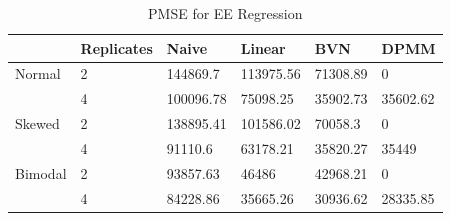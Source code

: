 \documentclass[11pt]{article}\usepackage[]{graphicx}\usepackage[]{color}
\begin{document}
\begin{landscape}
\begin{table}[ht]
\vspace{1cm}


\caption{Summary of Simulation under Bimodal Errors for N{\"a}ive, LME,  BVN, DPMM Models, respectively}
\label{bsumtable}
\end{table}

\end{landscape}
\restoregeometry


\begin{table}[ht]
\centering
\begin{tabular}{ll|llll}
  \hline
 & Replicates & Naive & Linear & BVN & DPMM \\ 
  \hline
Normal & 2 & 144869.7 & 113975.56 & 71308.89 & 0 \\ 
   & 4 & 100096.78 & 75098.25 & 35902.73 & 35602.62 \\ 
  Skewed & 2 & 138895.41 & 101586.02 & 70058.3 & 0 \\ 
   & 4 & 91110.6 & 63178.21 & 35820.27 & 35449 \\ 
  Bimodal & 2 & 93857.63 & 46486 & 42968.21 & 0 \\ 
   & 4 & 84228.86 & 35665.26 & 30936.62 & 28335.85 \\ 
   \hline
\end{tabular}
\caption{PMSE for EE Regression} 
\label{pmseee}
\end{table}
\end{document}
